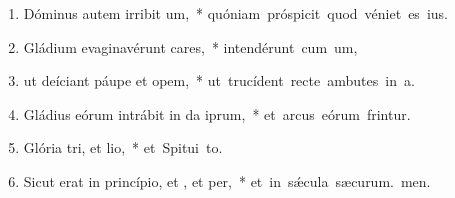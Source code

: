 \begin{flushleft}
\begin{enumerate}[leftmargin=*]
\item Dóminus autem irribit um,~* \mbox{quóniam próspicit quod véniet es ius.}

\item Gládium evaginavérunt cares,~* \mbox{intendérunt cum um,}

\item ut deíciant páupe et opem,~* \mbox{ut trucídent recte ambutes in a.}

\item Gládius eórum intrábit in da iprum,~* \mbox{et arcus eórum frintur.}

\item Glória tri, et lio,~* \mbox{et Spitui to.}

\item Sicut erat in princípio, et , et per,~* \mbox{et in s\'{\ae}cula sæcurum. men.}

\end{enumerate}
\end{flushleft}


